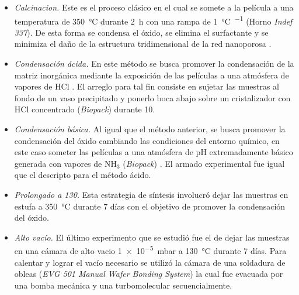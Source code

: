 				\begin{itemize}

				\item \textit{Calcinacion.} Este es el proceso clásico en el cual se somete a la película a una temperatura de \SI{350}{\celsius} durante \SI{2}{\hour} con una rampa de \SI{1}{\celsius.\min^{-1}} (Horno \textit{Indef 337}). De esta forma se condensa el óxido, se elimina el surfactante y se minimiza el daño de la estructura tridimensional de la red nanoporosa \cite{Crepaldi2003}.

				\item \textit{Condensación ácida.} En este método se busca promover la condensación de la matriz inorgánica mediante la exposición de las películas a una atmósfera de vapores de HCl \cite{Doshi2000a}. El arreglo para tal fin consiste en sujetar las muestras al fondo de un vaso precipitado y ponerlo boca abajo sobre un cristalizador con HCl concentrado (\textit{Biopack}) durante \SI{10}{\min}. 

				\item \textit{Condensación básica.} Al igual que el método anterior, se busca promover la condensación del óxido cambiando las condiciones del entorno químico, en este caso someter las películas a una atmósfera de pH extremadamente básico generada con vapores de NH$_3$ (\textit{Biopack}) \cite{Soler-Illia2012,Soler-Illia2011}. El armado experimental fue igual que el descripto para el método ácido.

				\item \textit{Prolongado a 130.} Esta estrategia de síntesis involucró dejar las muestras en estufa a \SI{350}{\celsius} durante 7 días con el objetivo de promover la condensación del óxido.

				\item \textit{Alto vacío.} El último experimento que se estudió fue  el de dejar las muestras en una cámara de alto vacio \SI{1e-5}{\milli\bar} a \SI{130}{\celsius} durante 7 días. Para calentar y lograr el vacío necesario se utilizó la cámara de una soldadura de obleas (\textit{EVG 501 Manual Wafer Bonding System}) la cual fue evacuada por una bomba mecánica y una turbomolecular secuencialmente.

				\end{itemize}
					
